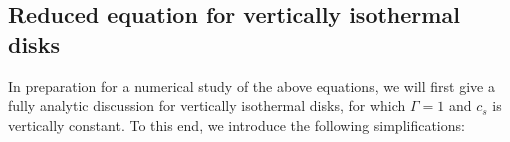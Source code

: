 \subsection{Reduced equation for vertically isothermal disks}\label{sec:simplified}

In preparation for a numerical study of the above equations, we will 
first give a fully analytic discussion for vertically isothermal
disks, for which $\Gamma=1$ and $c_s$ is vertically constant. To this end, 
we introduce the following simplifications:

